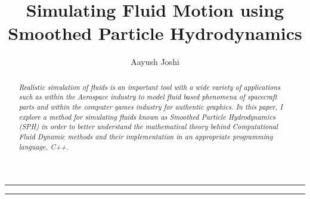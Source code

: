 \documentclass[a4paper,11pt]{article}
\title{\textbf{Simulating Fluid Motion using Smoothed Particle Hydrodynamics}}
\author{Aayush Joshi}
\date{}
\begin{document}
\maketitle

\par\noindent\rule{\textwidth}{0.3pt}

\begin{abstract}
\noindent \textit{Realistic simulation of fluids is an important tool with a wide variety of applications such as within the Aerospace industry to model fluid based phenomena of spacecraft parts and within the computer games industry for authentic graphics. In this paper, I explore a method for simulating fluids known as Smoothed Particle Hydrodynamics (SPH) in order to better understand the mathematical theory behind Computational Fluid Dynamic methods and their implementation in an appropriate programming language, C++.}
\end{abstract}

\par\noindent\rule{\textwidth}{0.3pt}
\tableofcontents
\newpage
\end{document}
